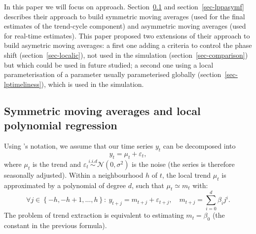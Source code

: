 \documentclass[
]{article}
\newcommand\1{\mathds{1}}
\begin{document}
In this paper we will focus on \textcite{proietti2008} approach.
Section~\ref{sec-sym-lp} and section~\ref{sec-lppasymf} describes their
approach to build symmetric moving averages (used for the final
estimates of the trend-cycle component) and asymmetric moving averages
(used for real-time estimates). This paper proposed two extensions of
their approach to build asymetric moving averages: a first one adding a
criteria to control the phase shift (section~\ref{sec-localic}), not
used in the simulation (section~\ref{sec-comparison}) but which could be
used in future studied; a second one using a local parameterisation of a
parameter usually parameterised globally
(section~\ref{sec-lptimeliness}), which is used in the simulation.

\subsection{Symmetric moving averages and local polynomial
regression}\label{sec-sym-lp}

Using \textcite{proietti2008}'s notation, we assume that our time series
\(y_t\) can be decomposed into \[
y_t=\mu_t+\varepsilon_t,
\] where \(\mu_t\) is the trend and
\(\varepsilon_{t}\overset{i.i.d}{\sim}\mathcal{N}(0,\sigma^{2})\) is the
noise (the series is therefore seasonally adjusted). Within a
neighbourhood \(h\) of \(t\), the local trend \(\mu_t\) is approximated
by a polynomial of degree \(d\), such that \(\mu_t\simeq m_{t}\) with:
\[
\forall j\in\left\{-h,-h+1,\dots,h\right\}:\:
y_{t+j}=m_{t+j}+\varepsilon_{t+j},\quad m_{t+j}=\sum_{i=0}^{d}\beta_{i}j^{i}.
\] The problem of trend extraction is equivalent to estimating
\(m_t=\beta_0\) (the constant in the previous formula).
\end{document}
